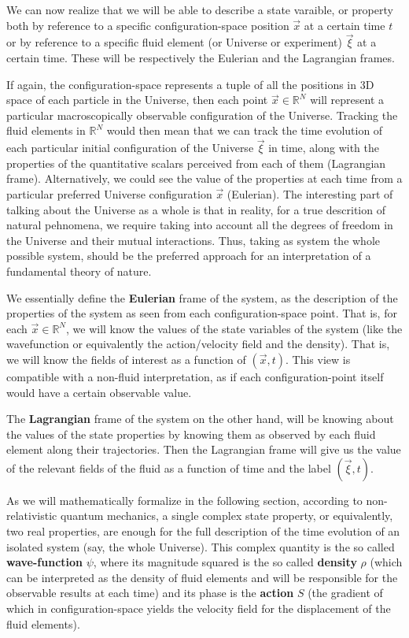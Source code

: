 \documentclass[11pt, a4paper]{article} %
\newcommand{\R}{\mathbb{R}} %
\begin{document}
We can now realize that we will be able to describe a state varaible, or property both by reference to a specific configuration-space position $\vec{x}$ at a certain time $t$ or by reference to a specific fluid element (or Universe or experiment) $\vec{\xi}$ at a certain time. These will be respectively the Eulerian and the Lagrangian frames. 

If again, the configuration-space represents a tuple of all the positions in 3D space of each particle in the Universe, then each point $\vec{x}\in \R^N$ will represent a particular macroscopically observable configuration of the Universe. Tracking the fluid elements in $\R^N$ would then mean that we can track the time evolution of each particular initial configuration of the Universe $\vec{\xi}$ in time, along with the properties of the quantitative scalars perceived from each of them (Lagrangian frame). Alternatively, we could see the value of the properties at each time from a particular preferred Universe configuration $\vec{x}$ (Eulerian). The interesting part of talking about the Universe as a whole is that in reality, for a true descrition of natural pehnomena, we require taking into account all the degrees of freedom in the Universe and their mutual interactions. Thus, taking as system the whole possible system, should be the preferred approach for an interpretation of a fundamental theory of nature. 

We essentially define the {\bf Eulerian} frame of the system, as the description of the properties of the system as seen from each configuration-space point. That is, for each $\vec{x}\in\R^N$, we will know the values of the state variables of the system (like the wavefunction or equivalently the action/velocity field and the density). That is, we will know the fields of interest as a function of $(\vec{x},t)$. This view is compatible with a non-fluid interpretation, as if each configuration-point itself would have a certain observable value. 

The {\bf Lagrangian} frame of the system on the other hand, will be knowing about the values of the state properties by knowing them as observed by each fluid element along their trajectories.  Then the Lagrangian frame will give us the value of the relevant fields of the fluid as a function of time and the label $(\vec{\xi},t)$.
 
As we will mathematically formalize in the following section, according to non-relativistic quantum mechanics, a single complex state property, or equivalently, two real properties, are enough for the full description of the time evolution of an isolated system (say, the whole Universe). This complex quantity is the so called {\bf wave-function} $\psi$, where its magnitude squared is the so called {\bf density} $\rho$ (which can be interpreted as the density of fluid elements and will be responsible for the observable results at each time) and its phase is the {\bf action} $S$ (the gradient of which in configuration-space yields the velocity field for the displacement of the fluid elements).
\end{document}
